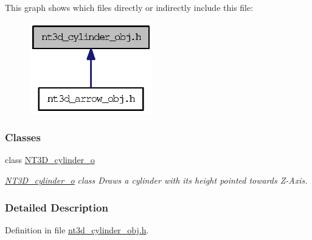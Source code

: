 This graph shows which files directly or indirectly include this file:
\nopagebreak
\begin{figure}[H]
\begin{center}
\leavevmode
\includegraphics[width=152pt]{nt3d__cylinder__obj_8h__dep__incl}
\end{center}
\end{figure}
\subsubsection*{Classes}
\begin{DoxyCompactItemize}
\item 
class \hyperlink{class_n_t3_d__cylinder__o}{NT3D\_\-cylinder\_\-o}
\begin{DoxyCompactList}\small\item\em \hyperlink{class_n_t3_d__cylinder__o}{NT3D\_\-cylinder\_\-o} class Draws a cylinder with its height pointed towards Z-\/Axis. \item\end{DoxyCompactList}\end{DoxyCompactItemize}


\subsubsection{Detailed Description}


Definition in file \hyperlink{nt3d__cylinder__obj_8h_source}{nt3d\_\-cylinder\_\-obj.h}.

